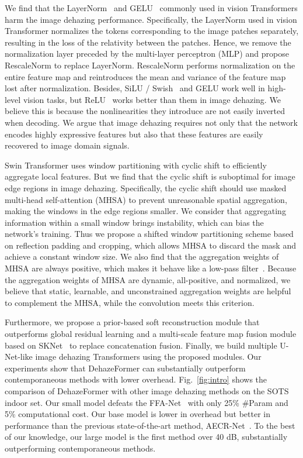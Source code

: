 \documentclass[journal]{IEEEtran}
\begin{document}
We find that the LayerNorm~\cite{ba2016layer} and GELU~\cite{hendrycks2016gaussian} commonly used in vision Transformers harm the image dehazing performance.
Specifically, the LayerNorm used in vision Transformer normalizes the tokens corresponding to the image patches separately, resulting in the loss of the relativity between the patches.
Hence, we remove the normalization layer preceded by the multi-layer perceptron (MLP) and propose RescaleNorm to replace LayerNorm.
RescaleNorm performs normalization on the entire feature map and reintroduces the mean and variance of the feature map lost after normalization.
Besides, SiLU / Swish~\cite{ramachandran2017searching} and GELU work well in high-level vision tasks, but ReLU~\cite{nair2010rectified} works better than them in image dehazing.
We believe this is because the nonlinearities they introduce are not easily inverted when decoding.
We argue that image dehazing requires not only that the network encodes highly expressive features but also that these features are easily recovered to image domain signals.

Swin Transformer uses window partitioning with cyclic shift to efficiently aggregate local features.
But we find that the cyclic shift is suboptimal for image edge regions in image dehazing.
Specifically, the cyclic shift should use masked multi-head self-attention (MHSA) to prevent unreasonable spatial aggregation, making the windows in the edge regions smaller.
We consider that aggregating information within a small window brings instability, which can bias the network's training.
Thus we propose a shifted window partitioning scheme based on reflection padding and cropping, which allows MHSA to discard the mask and achieve a constant window size.
We also find that the aggregation weights of MHSA are always positive, which makes it behave like a low-pass filter~\cite{park2022vision}.
Because the aggregation weights of MHSA are dynamic, all-positive, and normalized, we believe that static, learnable, and unconstrained aggregation weights are helpful to complement the MHSA, while the convolution meets this criterion.

Furthermore, we propose a prior-based soft reconstruction module that outperforms global residual learning and a multi-scale feature map fusion module based on SKNet~\cite{li2019selective} to replace concatenation fusion.
Finally, we build multiple U-Net-like image dehazing Transformers using the proposed modules.
Our experiments show that DehazeFormer can substantially outperform contemporaneous methods with lower overhead.
Fig.~\ref{fig:intro} shows the comparison of DehazeFormer with other image dehazing methods on the SOTS indoor set.
Our small model defeats the FFA-Net~\cite{qin2020ffa} with only 25\% \#Param and 5\% computational cost.
Our base model is lower in overhead but better in performance than the previous state-of-the-art method, AECR-Net~\cite{wu2021contrastive}. 
To the best of our knowledge, our large model is the first method over 40 dB, substantially outperforming contemporaneous methods.
\end{document}
